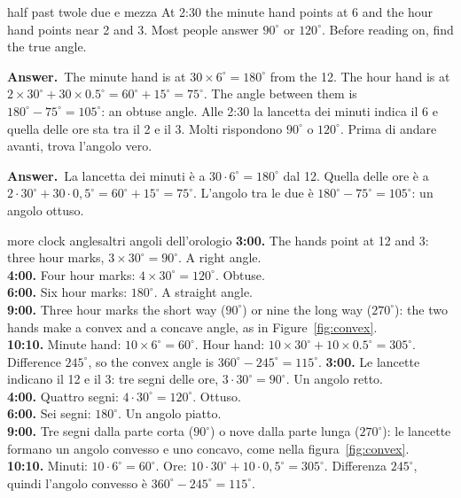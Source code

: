 \documentclass[10pt,a4paper,oneside]{book}
\newif\ifIT
\newcommand{\answer}{\par\vspace{2pt}{\color{deeporange}\rule[0.5ex]{\linewidth}{0.4pt}}\par
  {\sffamily\bfseries\small\color{deeporange}\ifIT Risposta\else Answer\fi.}\ }
\begin{document}
\begin{think}{half past two}{le due e mezza}
At 2:30 the minute hand points at 6 and the hour hand points near 2 and 3. Most people answer $90^\circ$ or $120^\circ$. Before reading on, find the true angle.
\answer The minute hand is at $30 \times 6^\circ = 180^\circ$ from the 12. The hour hand is at $2 \times 30^\circ + 30 \times 0.5^\circ = 60^\circ + 15^\circ = 75^\circ$. The angle between them is $180^\circ - 75^\circ = 105^\circ$: an obtuse angle.
\tcblower
Alle 2:30 la lancetta dei minuti indica il 6 e quella delle ore sta tra il 2 e il 3. Molti rispondono $90^\circ$ o $120^\circ$. Prima di andare avanti, trova l'angolo vero.
\answer La lancetta dei minuti è a $30 \cdot 6^\circ = 180^\circ$ dal 12. Quella delle ore è a $2 \cdot 30^\circ + 30 \cdot 0{,}5^\circ = 60^\circ + 15^\circ = 75^\circ$. L'angolo tra le due è $180^\circ - 75^\circ = 105^\circ$: un angolo ottuso.
\end{think}

\begin{example}{more clock angles}{altri angoli dell'orologio}
\textbf{3:00.} The hands point at 12 and 3: three hour marks, $3 \times 30^\circ = 90^\circ$. A right angle.\\
\textbf{4:00.} Four hour marks: $4 \times 30^\circ = 120^\circ$. Obtuse.\\
\textbf{6:00.} Six hour marks: $180^\circ$. A straight angle.\\
\textbf{9:00.} Three hour marks the short way ($90^\circ$) or nine the long way ($270^\circ$): the two hands make a convex and a concave angle, as in Figure~\ref{fig:convex}.\\
\textbf{10:10.} Minute hand: $10 \times 6^\circ = 60^\circ$. Hour hand: $10 \times 30^\circ + 10 \times 0.5^\circ = 305^\circ$. Difference $245^\circ$, so the convex angle is $360^\circ - 245^\circ = 115^\circ$.
\tcblower
\textbf{3:00.} Le lancette indicano il 12 e il 3: tre segni delle ore, $3 \cdot 30^\circ = 90^\circ$. Un angolo retto.\\
\textbf{4:00.} Quattro segni: $4 \cdot 30^\circ = 120^\circ$. Ottuso.\\
\textbf{6:00.} Sei segni: $180^\circ$. Un angolo piatto.\\
\textbf{9:00.} Tre segni dalla parte corta ($90^\circ$) o nove dalla parte lunga ($270^\circ$): le lancette formano un angolo convesso e uno concavo, come nella figura~\ref{fig:convex}.\\
\textbf{10:10.} Minuti: $10 \cdot 6^\circ = 60^\circ$. Ore: $10 \cdot 30^\circ + 10 \cdot 0{,}5^\circ = 305^\circ$. Differenza $245^\circ$, quindi l'angolo convesso è $360^\circ - 245^\circ = 115^\circ$.
\end{example}
\end{document}

